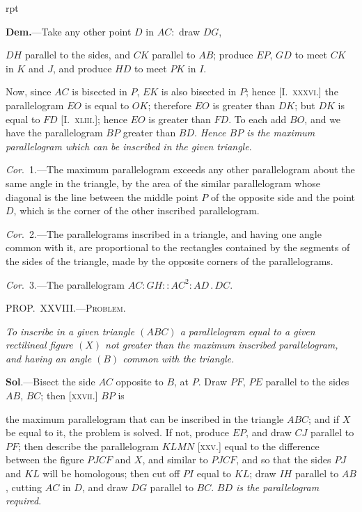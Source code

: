 \documentclass[oneside]{book}
\newcounter{wrapwidth}
\newcommand\mypropl[2]{
\bigskip\Needspace*{4\baselineskip}\begin{center}\textsc{#1}\end{center}
\hspace{\parindent}\emph{#2}\par\medskip
}
\newcommand\imgflow[3]{
\setcounter{wrapwidth}{#1}

\begin{wrapfigure}[#2]{r}{\value{wrapwidth}pt}
\begin{center}
\vspace{-0.3in}

\end{center}
\end{wrapfigure}
}
\newcommand\imgcent[2]{
\begin{center}

\end{center}
}
\begin{document}
\imgflow{140}{8}{f207}

\textbf{Dem.}---Take any other point $D$ in $AC:$ draw $DG$,

$DH$ parallel to the sides, and $CK$ parallel to $AB$;
produce $EP$, $GD$ to meet
$CK$ in $K$ and $J$, and produce $HD$ to meet $PK$ in $I$.

Now, since $AC$ is bisected
in $P$, $EK$ is also bisected
in $P$; hence [I.~\textsc{xxxvi.}] the
parallelogram $EO$ is equal
to $OK$; therefore $EO$ is
greater than $DK$; but $DK$ is equal to $FD$ [I.~\textsc{xliii.}];
hence $EO$ is greater than $FD$. To each add $BO$, and
we have the parallelogram $BP$ greater than $BD$.
\emph{Hence $BP$ is the maximum parallelogram which can be
inscribed in the given triangle}.

\emph{Cor}.~1.---The maximum parallelogram exceeds any
other parallelogram ab\-out the same angle in the triangle,
by the area of the similar parallelogram whose
diagonal is the line between the middle point $P$ of the
opposite side and the point $D$, which is the corner of
the other inscribed parallelogram.

\emph{Cor}.~2.---The parallelograms inscribed in a triangle,
and having one angle common with it, are proportional
to the rectangles contained by the segments of the
sides of the triangle, made by the opposite corners of
the parallelograms.

\emph{Cor}.~3.---The parallelogram $AC : GH :: AC^2 :
AD\,.\,DC$.

\mypropl{PROP\@.~XXVIII\@.---Problem.}{To inscribe in a given triangle $(ABC)$ a parallelogram
equal to a given rectilineal figure $(X)$ not greater than
the maximum inscribed parallelogram, and having an
angle $(B)$ common with the triangle.}

\textbf{Sol}.---Bisect the side $AC$ opposite to $B$, at $P$. Draw
$PF$, $PE$ parallel to the sides $AB$, $BC$; then [\textsc{xxvii}.] $BP$ is

the maximum parallelogram that can be inscribed in the
triangle $ABC$; and if $X$ be equal to it, the problem is
solved. If not, produce $EP$, and draw $CJ$ parallel to
$PF$; then describe the parallelogram $KLMN$ [\textsc{xxv.}]
equal to the difference between the figure $PJCF$ and
$X$, and similar to $PJCF$, and so that the sides $PJ$ and
$KL$ will be homologous; then cut off $PI$ equal to $KL$;
draw $IH$ parallel to $AB$, cutting $AC$ in $D$, and draw
$DG$ parallel to $BC$. \emph{$BD$ is the parallelogram required}.


\imgcent{200}{f208}
\end{document}
